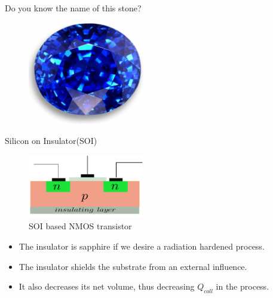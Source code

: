 \documentclass{beamer}
\begin{document}
\begin{frame}[shrink=10]{ Do you know the name of this stone?}

\begin{center}
 \begin{figure}[h]
  \includegraphics[width=2in]{sapphire}
 \end{figure}
\end{center}
\pause
{}

\end{frame}

\begin{frame}[shrink=10]{Silicon on Insulator(SOI)}
 \begin{center}
 \begin{figure}[h]
  \includegraphics[width=2in]{soi}
  \caption{\footnotesize SOI based NMOS transistor}
 \end{figure}
\end{center}
\begin{itemize}
 \item The insulator is sapphire if we desire a radiation hardened process.
  \item The insulator shields the substrate from an external influence. 
  \item It also decreases its net volume, thus decreasing $Q_{coll}$ in the process.
\end{itemize}
\end{frame}
\end{document}
